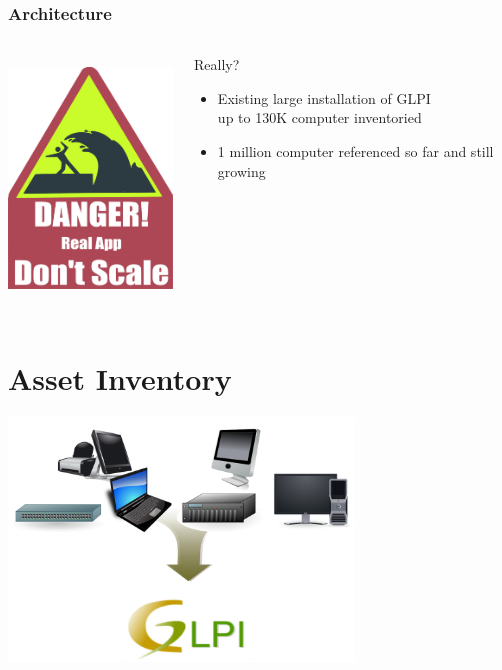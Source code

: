 \documentclass{beamer}
\begin{document}
\begin{frame}
    \frametitle{Architecture}

 \begin{columns}
 \begin{column}{0.34\textwidth}
    \includegraphics[height=6.5cm]{pics/scale.pdf}
 \end{column}
 \begin{column}{0.90\textwidth}
    \begin{block}{Really?}
        \begin{itemize}
            \item Existing large installation of GLPI \\
            \small{up to 130K computer inventoried}
            \item 1 million computer referenced so far and still growing
        \end{itemize}
    \end{block}

 \end{column}
\end{columns}

\end{frame}


\section{Asset Inventory}

\begin{frame}
\includegraphics[height=6.5cm]{pics/bigpicture.pdf}
\end{frame}
\end{document}
